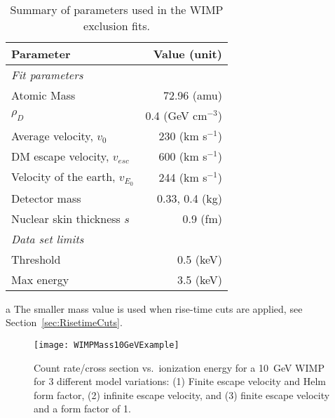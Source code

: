 		\begin{table}
			\centering
			\caption[Summary of parameters used in the WIMP exclusion fits]
			{Summary of parameters used in the WIMP exclusion fits.}
			\label{tab:BeGeFitParameters}
			\smallskip
			\begin{threeparttable}
				\begin{tabular}{l r}
					\toprule
					Parameter & Value (unit) \\
					\midrule
					\multicolumn{2}{l}{\emph{Fit parameters}} \\
					Atomic Mass & 72.96 (amu) \\
					$\rho_{D}$  &  0.4 (GeV cm$^{-3}$) \\
					Average velocity, $v_{0}$ & 230 (km s$^{-1}$) \\
					DM escape velocity, $v_{esc}$ & 600 (km s$^{-1}$) \\
					Velocity of the earth, $v_{E_{0}}$ & 244 (km s$^{-1}$) \\
					Detector mass &  0.33, 0.4\tnote{a} (kg) \\
					Nuclear skin thickness $s$ & 0.9 (fm) \\
					\multicolumn{2}{l}{\emph{Data set limits}} \\					
					Threshold & 0.5 (keV) \\
					Max energy & 3.5 (keV) \\					
					\bottomrule
				\end{tabular}	
				 \begin{tablenotes}
				       \item[a] {The smaller mass value is used when rise-time cuts are applied, see 
				       Section~\ref{sec:RisetimeCuts}.}
			     	\end{tablenotes}
			\end{threeparttable}
		\end{table}
		\begin{figure}
			\centering
			\texttt{[image: WIMPMass10GeVExample]}
			\caption[Count rate/cross section vs.~ionization energy for a 10~GeV WIMP]
			{Count rate/cross section vs.~ionization energy for a 10~GeV WIMP for 3 different model 
			variations: (1) Finite escape velocity and Helm form factor, (2) infinite escape velocity, 
			and (3) finite escape velocity and a form factor of 1.}
			\label{fig:1DDMSignal}
		\end{figure}
		
